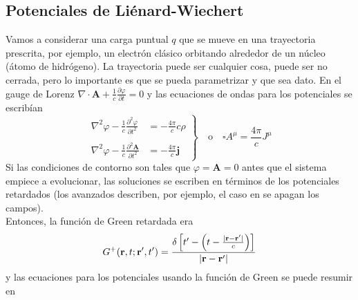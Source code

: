 \subsection{Potenciales de Liénard-Wiechert}
Vamos a considerar una carga puntual $q$ que se mueve en una trayectoria prescrita, por ejemplo, un electrón clásico orbitando alrededor de un núcleo (átomo de hidrógeno). La trayectoria puede ser cualquier cosa, puede ser no cerrada, pero lo importante es que se pueda parametrizar y que sea dato. En el gauge de Lorenz $\nabla \cdot \textbf{A} + \frac{1}{c}\frac{\partial \varphi}{\partial t} = 0$ y las ecuaciones de ondas para los potenciales se escribían
\begin{equation*}
    \left.
        \begin{array}{ll}
             \nabla^{2}\varphi 
             - \frac{1}{c} \frac{\partial^{2}\varphi}{\partial t^{2}} 
             & = -\frac{4\pi}{c}c\rho  \\
             &\\
             \nabla^{2}\varphi
             - \frac{1}{c} \frac{\partial^{2}\textbf{A}}{\partial t^{2}} 
             & = - \frac{4\pi}{c}\textbf{j} 
        \end{array}
    \right\}
    \quad
    \mbox{o}
    \quad
    \square A^{\mu} = \frac{4\pi}{c}J^{\mu}
\end{equation*}
Si las condiciones de contorno son tales que $\varphi = \textbf{A} = 0$ antes que el sistema empiece a evolucionar, las soluciones se escriben en términos de los potenciales retardados (los avanzados describen, por ejemplo, el caso en se apagan los campos).\\
\indent Entonces, la función de Green retardada era
\begin{equation*}
    G^{+}(\textbf{r},t;\textbf{r}',t') =
    \frac%
    {%
        \delta
        \left[
            t' - 
            \left(
                t - \frac{|\textbf{r}-\textbf{r}'|}{c}
            \right)
        \right]
    }
    {%
        |\textbf{r}-\textbf{r}'|
    }
\end{equation*}
y las ecuaciones para los potenciales usando la función de Green se puede resumir en
